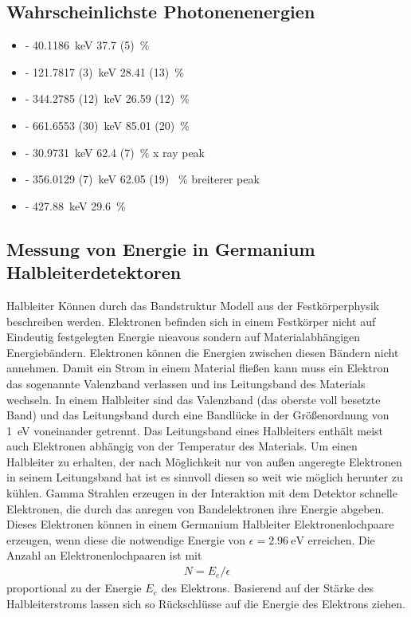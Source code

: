 \subsection{Wahrscheinlichste Photonenenergien}
\begin{itemize} 
    \item[\ce   {^{152}Eu}] - \qty{ 40.1186 } {\keV} \qty{37.7 (5)}{\%} 
    \item[\ce   {^{152}Eu}] - \qty{121.7817 (3)} {\keV} \qty{28.41 (13)}{\%} 
    \item[\ce   {^{152}Eu}] - \qty{344.2785 (12)} {\keV} \qty{26.59 (12)}{\%}
    \item[\ce   {^{137}Cs}] - \qty{661.6553 (30)} {\keV} \qty{85.01 (20)}{\%}
    \item[\ce   {^{133}Ba}] - \qty{30.9731}{\keV} \qty{62.4 (7)}{\%} x ray peak
    \item[\ce   {^{133}Ba}] - \qty{356.0129 (7)}{\keV} \qty{62.05 (19) 	}{\%} breiterer peak
    \item[\ce   {^{125}Sb}] - \qty{427.88}{\keV} \qty{29.6}{\%}
\end{itemize}
\cite{web:lara}


\subsection{Messung von Energie in Germanium Halbleiterdetektoren \cite{book:gil}}
Halbleiter Können durch das Bandstruktur Modell aus der Festkörperphysik beschreiben werden.
Elektronen befinden sich in einem Festkörper nicht auf Eindeutig festgelegten Energie nieavous sondern auf 
Materialabhängigen Energiebändern.
Elektronen können die Energien zwischen diesen Bändern nicht annehmen.
Damit ein Strom in einem Material fließen kann muss ein Elektron das sogenannte Valenzband verlassen und
ins Leitungsband des Materials wechseln.
In einem Halbleiter sind das Valenzband (das oberste voll besetzte Band) und das Leitungsband durch eine 
Bandlücke in der Größenordnung von \qty{1}{\eV} voneinander getrennt.
Das Leitungsband eines Halbleiters enthält meist auch Elektronen abhängig von der Temperatur des Materials.
Um einen Halbleiter zu erhalten, der nach Möglichkeit nur von außen angeregte Elektronen in seinem Leitungsband hat 
ist es sinnvoll diesen so weit wie möglich herunter zu kühlen.
Gamma Strahlen  erzeugen in der Interaktion mit dem Detektor schnelle Elektronen, die durch das anregen
von Bandelektronen ihre Energie abgeben.
Dieses Elektronen können in einem Germanium Halbleiter Elektronenlochpaare erzeugen, wenn diese die notwendige Energie von
$\epsilon = \qty{2.96}{\eV}$ erreichen. 
Die Anzahl an Elektronenlochpaaren ist mit 
\begin{align}
    N = E_e / \epsilon 
\end{align}
proportional zu der Energie $E_e$ des Elektrons.
Basierend auf der Stärke des Halbleiterstroms lassen sich so Rückschlüsse auf die Energie des Elektrons ziehen.


